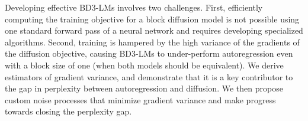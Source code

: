 \documentclass{article} %
\def\algos{BD3-LMs}
\begin{document}
Developing effective \algos{} involves two challenges. First, efficiently computing the training objective for a block diffusion model is not possible using one standard forward pass of a neural network %
and requires developing specialized algorithms.
Second, training is hampered by the high variance of the gradients of the diffusion objective, causing \algos{} to under-perform autoregression even with a block size of one (when both models should be equivalent). We derive estimators of gradient variance, and demonstrate that it is a key contributor to the gap in perplexity between autoregression and diffusion. We then propose custom noise processes that minimize gradient variance and make progress towards closing the perplexity gap.

\begin{figure}
\centering
    \hspace*{-1.4cm}
    \label{figs/graphical-abstract}
    \vspace{-5pt}
\end{figure}

\end{document}
